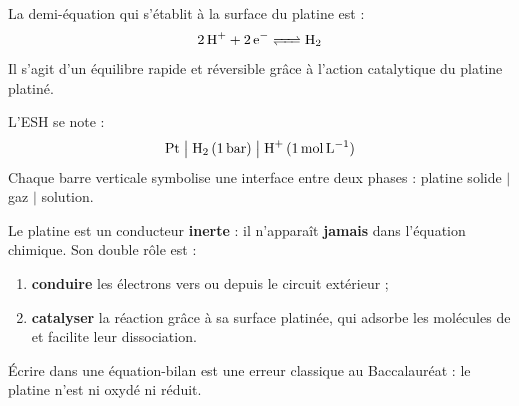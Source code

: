 \documentclass[11pt]{article}
\begin{document}
La demi-équation qui s'établit à la surface du platine est :
\[ \ce{2H+ + 2e- <=> H2} \]
Il s'agit d'un équilibre rapide et réversible grâce à l'action catalytique du platine platiné.

\begin{definition}
L'ESH se note :
\[ \ce{Pt} \; \big| \; \ce{H2}\,(\SI{1}{bar}) \; \big| \; \ce{H+}\,(\SI{1}{mol.L^{-1}}) \]
Chaque barre verticale symbolise une interface entre deux phases : platine solide $|$ gaz $|$ solution.
\end{definition}

\begin{attention}
Le platine est un conducteur \textbf{inerte} : il n'apparaît \textbf{jamais} dans l'équation chimique. Son double rôle est :
\begin{enumerate}
\item \textbf{conduire} les électrons vers ou depuis le circuit extérieur ;
\item \textbf{catalyser} la réaction  grâce à sa surface platinée, qui adsorbe les molécules de  et facilite leur dissociation.
\end{enumerate}
Écrire  dans une équation-bilan est une erreur classique au Baccalauréat : le platine n'est ni oxydé ni réduit.
\end{attention}
\end{document}
